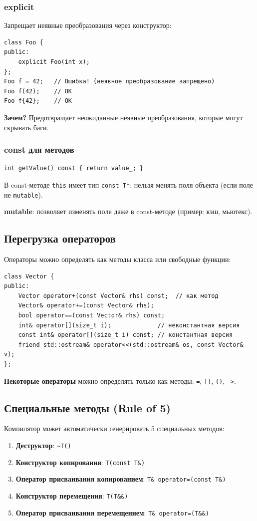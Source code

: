 \documentclass[12pt,a4paper]{article}
\begin{document}
\subsubsection{explicit}
Запрещает неявные преобразования через конструктор:
\begin{lstlisting}
class Foo {
public:
    explicit Foo(int x);
};
Foo f = 42;   // Ошибка! (неявное преобразование запрещено)
Foo f(42);    // OK
Foo f{42};    // OK
\end{lstlisting}
\textbf{Зачем?} Предотвращает неожиданные неявные преобразования, которые могут скрывать баги.

\subsubsection{const для методов}
\begin{lstlisting}
int getValue() const { return value_; }
\end{lstlisting}
В const-методе \texttt{this} имеет тип \texttt{const T*}: нельзя менять поля объекта (если поле не \texttt{mutable}).

\textbf{mutable}: позволяет изменять поле даже в const-методе (пример: кэш, мьютекс).

\subsection{Перегрузка операторов}

Операторы можно определять как методы класса или свободные функции:
\begin{lstlisting}
class Vector {
public:
    Vector operator+(const Vector& rhs) const;  // как метод
    Vector& operator+=(const Vector& rhs);
    bool operator==(const Vector& rhs) const;
    int& operator[](size_t i);             // неконстантная версия
    const int& operator[](size_t i) const; // константная версия
    friend std::ostream& operator<<(std::ostream& os, const Vector& v);
};
\end{lstlisting}

\textbf{Некоторые операторы} можно определять только как методы: \texttt{=}, \texttt{[]}, \texttt{()}, \texttt{->}.

\subsection{Специальные методы (Rule of 5)}

Компилятор может автоматически генерировать 5 специальных методов:
\begin{enumerate}
    \item \textbf{Деструктор}: \texttt{\~{}T()}
    \item \textbf{Конструктор копирования}: \texttt{T(const T\&)}
    \item \textbf{Оператор присваивания копированием}: \texttt{T\& operator=(const T\&)}
    \item \textbf{Конструктор перемещения}: \texttt{T(T\&\&)}
    \item \textbf{Оператор присваивания перемещением}: \texttt{T\& operator=(T\&\&)}
\end{enumerate}
\end{document}
